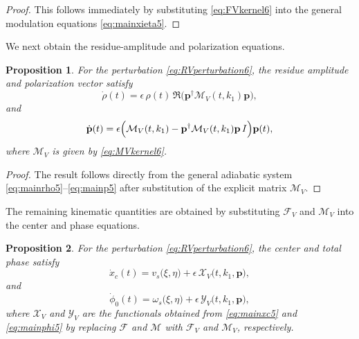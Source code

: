 \documentclass[11pt]{amsart}
\newtheorem{proposition}{Proposition}[section]
\theoremstyle{definition}
\numberwithin{equation}{section}
\begin{document}
\begin{proof}
This follows immediately by substituting \eqref{eq:FVkernel6} into the general modulation equations \eqref{eq:mainxieta5}.
\end{proof}

We next obtain the residue-amplitude and polarization equations.

\begin{proposition}
For the perturbation \eqref{eq:RVperturbation6}, the residue amplitude and polarization vector satisfy
\begin{equation}
\dot{\rho}(t)
=
\epsilon\,\rho(t)\,
\Re\bigl(\mathbf p^\dagger \mathcal M_V(t,k_1)\mathbf p\bigr),
\label{eq:rhoExplicit6}
\end{equation}
and
\begin{equation}
\dot{\mathbf p}(t)
=
\epsilon
\Bigl(
\mathcal M_V(t,k_1)
-
\mathbf p^\dagger \mathcal M_V(t,k_1)\mathbf p\,I
\Bigr)\mathbf p(t),
\label{eq:pExplicit6}
\end{equation}
where \(\mathcal M_V\) is given by \eqref{eq:MVkernel6}.
\end{proposition}

\begin{proof}
The result follows directly from the general adiabatic system \eqref{eq:mainrho5}--\eqref{eq:mainp5} after substitution of the explicit matrix \(\mathcal M_V\).
\end{proof}

The remaining kinematic quantities are obtained by substituting \(\mathcal F_V\) and \(\mathcal M_V\) into the center and phase equations.

\begin{proposition}
For the perturbation \eqref{eq:RVperturbation6}, the center and total phase satisfy
\begin{equation}
\dot{x}_c(t)=v_s\bigl(\xi,\eta\bigr)+\epsilon\,\mathcal X_V\bigl(t,k_1,\mathbf p\bigr),
\label{eq:xcExplicit6}
\end{equation}
and
\begin{equation}
\dot{\phi}_0(t)=\omega_s\bigl(\xi,\eta\bigr)+\epsilon\,\mathcal Y_V\bigl(t,k_1,\mathbf p\bigr),
\label{eq:phiExplicit6}
\end{equation}
where \(\mathcal X_V\) and \(\mathcal Y_V\) are the functionals obtained from \eqref{eq:mainxc5} and \eqref{eq:mainphi5} by replacing \(\mathcal F\) and \(\mathcal M\) with \(\mathcal F_V\) and \(\mathcal M_V\), respectively.
\end{proposition}
\end{document}
